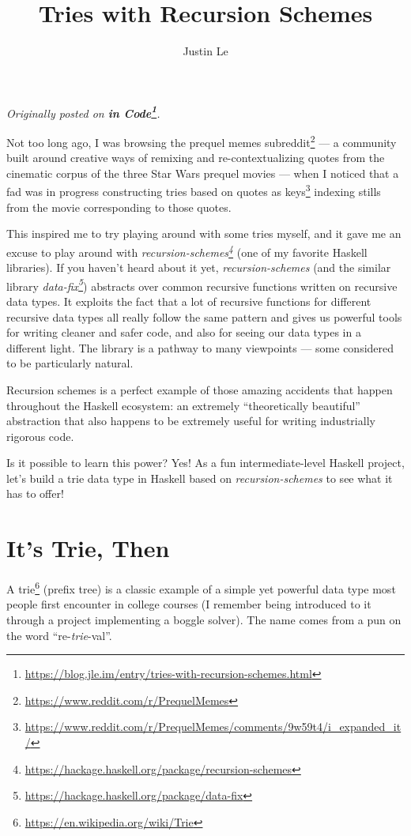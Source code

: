 \documentclass[]{article}
\title{Tries with Recursion Schemes}
\author{Justin Le}
\renewcommand{\href}[2]{#2\footnote{\url{#1}}}
\begin{document}
\maketitle

\emph{Originally posted on
\textbf{\href{https://blog.jle.im/entry/tries-with-recursion-schemes.html}{in
Code}}.}

Not too long ago, I was browsing the
\href{https://www.reddit.com/r/PrequelMemes}{prequel memes subreddit} --- a
community built around creative ways of remixing and re-contextualizing quotes
from the cinematic corpus of the three Star Wars prequel movies --- when I
noticed that a fad was in progress
\href{https://www.reddit.com/r/PrequelMemes/comments/9w59t4/i_expanded_it/}{constructing
tries based on quotes as keys} indexing stills from the movie corresponding to
those quotes.

This inspired me to try playing around with some tries myself, and it gave me an
excuse to play around with
\emph{\href{https://hackage.haskell.org/package/recursion-schemes}{recursion-schemes}}
(one of my favorite Haskell libraries). If you haven't heard about it yet,
\emph{recursion-schemes} (and the similar library
\emph{\href{https://hackage.haskell.org/package/data-fix}{data-fix}}) abstracts
over common recursive functions written on recursive data types. It exploits the
fact that a lot of recursive functions for different recursive data types all
really follow the same pattern and gives us powerful tools for writing cleaner
and safer code, and also for seeing our data types in a different light. The
library is a pathway to many viewpoints --- some considered to be particularly
natural.

Recursion schemes is a perfect example of those amazing accidents that happen
throughout the Haskell ecosystem: an extremely ``theoretically beautiful''
abstraction that also happens to be extremely useful for writing industrially
rigorous code.

Is it possible to learn this power? Yes! As a fun intermediate-level Haskell
project, let's build a trie data type in Haskell based on
\emph{recursion-schemes} to see what it has to offer!

\hypertarget{its-trie-then}{%
\section{It's Trie, Then}\label{its-trie-then}}

A \href{https://en.wikipedia.org/wiki/Trie}{trie} (prefix tree) is a classic
example of a simple yet powerful data type most people first encounter in
college courses (I remember being introduced to it through a project
implementing a boggle solver). The name comes from a pun on the word
``re-\emph{trie}-val''.
\end{document}

